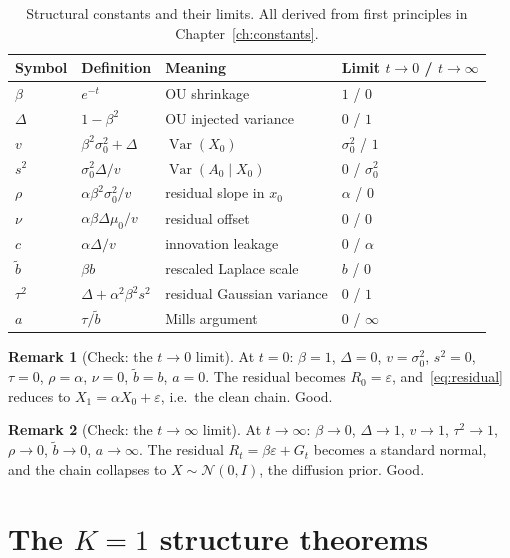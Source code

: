\documentclass[11pt,a4paper,openany]{book}
\theoremstyle{plainserif}
\theoremstyle{definition}
\theoremstyle{remarkstyle}
\newtheorem*{remark}{Remark}
\newcommand{\V}{\operatorname{Var}}
\newcommand{\Normal}{\mathcal{N}}
\newcommand{\btilde}{\tilde{b}}
\begin{document}
\begin{table}[h]
\centering\small
\begin{tabular}{l l l l}
\hline
Symbol & Definition & Meaning & Limit $t\to 0$ / $t\to\infty$\\ \hline
$\beta$ & $e^{-t}$ & OU shrinkage & $1$ / $0$\\
$\Delta$ & $1-\beta^2$ & OU injected variance & $0$ / $1$\\
$v$ & $\beta^2\sigma_0^2 + \Delta$ & $\V(X_0)$ & $\sigma_0^2$ / $1$\\
$s^2$ & $\sigma_0^2\Delta/v$ & $\V(A_0\mid X_0)$ & $0$ / $\sigma_0^2$\\
$\rho$ & $\alpha\beta^2\sigma_0^2/v$ & residual slope in $x_0$ & $\alpha$ / $0$\\
$\nu$ & $\alpha\beta\Delta\mu_0/v$ & residual offset & $0$ / $0$\\
$c$ & $\alpha\Delta/v$ & innovation leakage & $0$ / $\alpha$\\
$\btilde$ & $\beta b$ & rescaled Laplace scale & $b$ / $0$\\
$\tau^2$ & $\Delta + \alpha^2\beta^2 s^2$ & residual Gaussian variance & $0$ / $1$\\
$a$ & $\tau/\btilde$ & Mills argument & $0$ / $\infty$\\
\hline
\end{tabular}
\caption{Structural constants and their limits. All derived from
first principles in Chapter~\ref{ch:constants}.}
\label{tab:constants}
\end{table}

\begin{remark}[Check: the $t\to 0$ limit]
At $t=0$: $\beta=1$, $\Delta=0$, $v = \sigma_0^2$, $s^2 = 0$,
$\tau = 0$, $\rho = \alpha$, $\nu = 0$, $\btilde = b$, $a = 0$.
The residual becomes $R_0 = \varepsilon$, and~\eqref{eq:residual}
reduces to $X_1 = \alpha X_0 + \varepsilon$, i.e.\ the clean chain.
Good.
\end{remark}

\begin{remark}[Check: the $t\to\infty$ limit]
At $t\to\infty$: $\beta\to 0$, $\Delta\to 1$, $v\to 1$, $\tau^2\to 1$,
$\rho\to 0$, $\btilde\to 0$, $a\to\infty$. The residual
$R_t = \beta\varepsilon + G_t$ becomes a standard normal, and the chain
collapses to $X \sim \Normal(0, I)$, the diffusion prior. Good.
\end{remark}

\part{The $K{=}1$ structure theorems}
\end{document}
